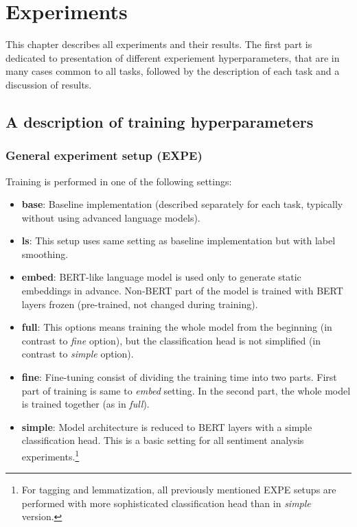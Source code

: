 \chapter{Experiments}
\label{chap:exp}
This chapter describes all experiments and their results. The first part is dedicated to presentation of different experiement hyperparameters, that are in many cases common to all tasks, followed by the description of each task and a discussion of results.
\section{A description of training hyperparameters}
\label{sec:expe}
\subsection{General experiment setup (EXPE)}
Training is performed in one of the following settings:
\begin{itemize}
\item \textbf{base}: Baseline implementation (described separately for each task, typically without using advanced language models).
\item \textbf{ls}: This setup uses same setting as baseline implementation but with label smoothing.
\item \textbf{embed}: BERT-like language model is used only to generate static embeddings in advance. Non-BERT part of the model is trained with BERT layers frozen (pre-trained, not changed during training).
\item \textbf{full}: This options means training the whole model from the beginning (in contrast to \textit{fine} option), but the classification head is not simplified (in contrast to \textit{simple} option).
\item \textbf{fine}: Fine-tuning consist of dividing the training time into two parts. First part of training is same to \textit{embed} setting. In the second part, the whole model is trained together (as in \textit{full}).
\item \textbf{simple}: Model architecture is reduced to BERT layers with a simple classification head. This is a basic setting for all sentiment analysis experiments.\footnote{For tagging and lemmatization, all previously mentioned EXPE setups are performed with more sophisticated classification head than in \textit{simple} version.} 
\end{itemize}
